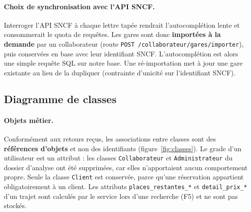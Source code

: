 \documentclass[11pt,a4paper]{article}
\newcommand{\route}[1]{\texttt{#1}}
\newcommand{\code}[1]{\texttt{#1}}
\begin{document}
\paragraph{Choix de synchronisation avec l'API SNCF.}
Interroger l'API SNCF à chaque lettre tapée rendrait l'autocomplétion lente et consommerait le
quota de requêtes. Les gares sont donc \textbf{importées à la demande} par un collaborateur
(route \route{POST /collaborateur/gares/importer}), puis conservées en base avec leur identifiant
SNCF. L'autocomplétion est alors une simple requête SQL sur notre base. Une ré-importation met à
jour une gare existante au lieu de la dupliquer (contrainte d'unicité sur l'identifiant SNCF).

\subsection{Diagramme de classes}

\paragraph{Objets métier.}
Conformément aux retours reçus, les associations entre classes sont des \textbf{références
d'objets} et non des identifiants (figure~\ref{fig:classes}). Le grade d'un utilisateur est un
attribut : les classes \code{Collaborateur} et \code{Administrateur} du dossier d'analyse ont été
supprimées, car elles n'apportaient aucun comportement propre. Seule la classe \code{Client} est
conservée, parce qu'une réservation appartient obligatoirement à un client. Les attributs
\code{places\_restantes\_*} et \code{detail\_prix\_*} d'un trajet sont calculés par le service lors
d'une recherche (F5) et ne sont pas stockés.
\end{document}
